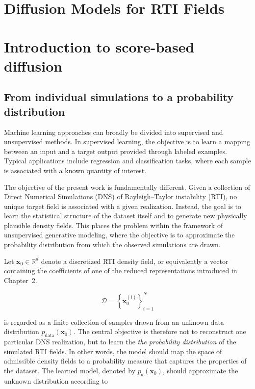 \section{Diffusion Models for RTI Fields}

\section{Introduction to score-based diffusion}

\subsection{From individual simulations to a probability distribution}

Machine learning approaches can broadly be divided into supervised and unsupervised methods. In supervised learning, the objective is to learn a mapping between an input and a target output provided through labeled examples. Typical applications include regression and classification tasks, where each sample is associated with a known quantity of interest.

The objective of the present work is fundamentally different. Given a collection of Direct Numerical Simulations (DNS) of Rayleigh--Taylor instability (RTI), no unique target field is associated with a given realization. Instead, the goal is to learn the statistical structure of the dataset itself and to generate new physically plausible density fields. This places the problem within the framework of unsupervised generative modeling, where the objective is to approximate the probability distribution from which the observed simulations are drawn.

Let $\mathbf{x}_0\in\mathbb{R}^{d}$ denote a discretized RTI density field, or equivalently a vector containing the coefficients of one of the reduced representations introduced in Chapter~2.

\begin{equation}
    \mathcal{D}=\left\{\mathbf{x}_0^{(i)}\right\}_{i=1}^{N}
\end{equation}

is regarded as a finite collection of samples drawn from an unknown data
distribution $p_{\mathrm{data}}(\mathbf{x}_0)$. The central objective is therefore not to reconstruct one particular DNS realization, but to
learn the \emph{the probability distribution} of the simulated RTI
fields. In other words, the model should map the space of admissible density fields to a probability measure that captures the properties of the dataset.
The learned model, denoted by $p_{\theta}(\mathbf{x}_0)$, should approximate the
unknown distribution according to

